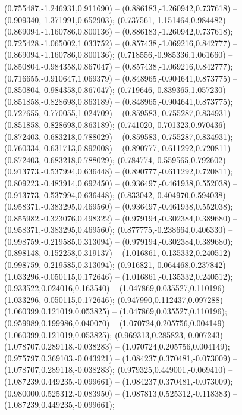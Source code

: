 (0.755487,-1.246931,0.911690) -- (0.886183,-1.260942,0.737618) -- (0.909340,-1.371991,0.652903);
 (0.737561,-1.151464,0.984482) -- (0.869094,-1.160786,0.800136) -- (0.886183,-1.260942,0.737618);
 (0.725428,-1.065002,1.033752) -- (0.857438,-1.069216,0.842777) -- (0.869094,-1.160786,0.800136);
 (0.718556,-0.985336,1.061660) -- (0.850804,-0.984358,0.867047) -- (0.857438,-1.069216,0.842777);
 (0.716655,-0.910647,1.069379) -- (0.848965,-0.904641,0.873775) -- (0.850804,-0.984358,0.867047);
 (0.719646,-0.839365,1.057230) -- (0.851858,-0.828698,0.863189) -- (0.848965,-0.904641,0.873775);
 (0.727655,-0.770055,1.024709) -- (0.859583,-0.755287,0.834931) -- (0.851858,-0.828698,0.863189);
 (0.741020,-0.701323,0.970436) -- (0.872403,-0.683218,0.788029) -- (0.859583,-0.755287,0.834931);
 (0.760334,-0.631713,0.892008) -- (0.890777,-0.611292,0.720811) -- (0.872403,-0.683218,0.788029);
 (0.784774,-0.559565,0.792602) -- (0.913773,-0.537994,0.636448) -- (0.890777,-0.611292,0.720811);
 (0.809223,-0.483914,0.692450) -- (0.936497,-0.461938,0.552038) -- (0.913773,-0.537994,0.636448);
 (0.833042,-0.404970,0.594038) -- (0.958371,-0.383295,0.469560) -- (0.936497,-0.461938,0.552038);
 (0.855982,-0.323076,0.498322) -- (0.979194,-0.302384,0.389680) -- (0.958371,-0.383295,0.469560);
 (0.877775,-0.238664,0.406330) -- (0.998759,-0.219585,0.313094) -- (0.979194,-0.302384,0.389680);
 (0.898148,-0.152258,0.319137) -- (1.016861,-0.135332,0.240512) -- (0.998759,-0.219585,0.313094);
 (0.916821,-0.064468,0.237842) -- (1.033296,-0.050115,0.172646) -- (1.016861,-0.135332,0.240512);
 (0.933522,0.024016,0.163540) -- (1.047869,0.035527,0.110196) -- (1.033296,-0.050115,0.172646);
 (0.947990,0.112437,0.097288) -- (1.060399,0.121019,0.053825) -- (1.047869,0.035527,0.110196);
 (0.959989,0.199986,0.040070) -- (1.070724,0.205756,0.004149) -- (1.060399,0.121019,0.053825);
 (0.969313,0.285823,-0.007243) -- (1.078707,0.289118,-0.038283) -- (1.070724,0.205756,0.004149);
 (0.975797,0.369103,-0.043921) -- (1.084237,0.370481,-0.073009) -- (1.078707,0.289118,-0.038283);
 (0.979325,0.449001,-0.069410) -- (1.087239,0.449235,-0.099661) -- (1.084237,0.370481,-0.073009);
 (0.980000,0.525312,-0.083950) -- (1.087813,0.525312,-0.118383) -- (1.087239,0.449235,-0.099661);
